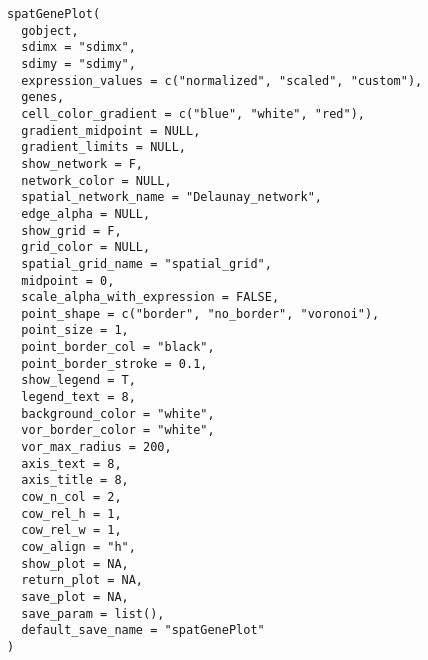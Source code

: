 \documentclass[a4paper]{book}
\begin{document}
\begin{Usage}
\begin{verbatim}
spatGenePlot(
  gobject,
  sdimx = "sdimx",
  sdimy = "sdimy",
  expression_values = c("normalized", "scaled", "custom"),
  genes,
  cell_color_gradient = c("blue", "white", "red"),
  gradient_midpoint = NULL,
  gradient_limits = NULL,
  show_network = F,
  network_color = NULL,
  spatial_network_name = "Delaunay_network",
  edge_alpha = NULL,
  show_grid = F,
  grid_color = NULL,
  spatial_grid_name = "spatial_grid",
  midpoint = 0,
  scale_alpha_with_expression = FALSE,
  point_shape = c("border", "no_border", "voronoi"),
  point_size = 1,
  point_border_col = "black",
  point_border_stroke = 0.1,
  show_legend = T,
  legend_text = 8,
  background_color = "white",
  vor_border_color = "white",
  vor_max_radius = 200,
  axis_text = 8,
  axis_title = 8,
  cow_n_col = 2,
  cow_rel_h = 1,
  cow_rel_w = 1,
  cow_align = "h",
  show_plot = NA,
  return_plot = NA,
  save_plot = NA,
  save_param = list(),
  default_save_name = "spatGenePlot"
)
\end{verbatim}
\end{Usage}
%
\end{document}

